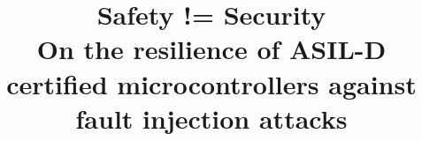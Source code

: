 \documentclass[10pt, conference, compsocconf]{IEEEtran}
\begin{document}
%
\title{Safety != Security \\ {\large On the resilience of ASIL-D certified microcontrollers against fault injection attacks}}






% 








\maketitle
\end{document}
